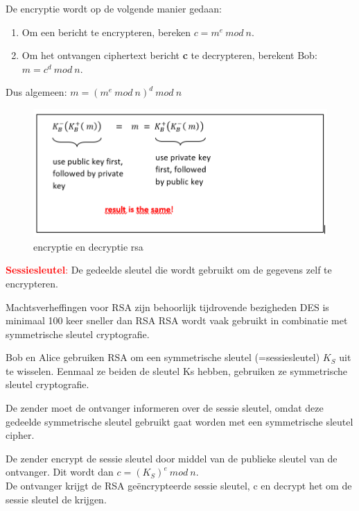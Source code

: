 
De encryptie wordt op de volgende manier gedaan:

\begin{enumerate}
\item Om een bericht te encrypteren, bereken $c = m^e\ mod\ n$.
\item Om het ontvangen ciphertext bericht \textbf{c} te decrypteren, berekent Bob: $m = c^d\ mod\ n$.
\end{enumerate}

\noindent Dus algemeen: $m = (m^e\ mod\ n)^d \ mod\ n$

\begin{figure}[h]
    \centering
    \includegraphics[width=7in]{./img/imghfdst8/diffie.PNG}
    \caption{encryptie en decryptie rsa}      
    \label{fig:encryptie en decryptie rsa }
\end{figure}


\textcolor{red}{\textbf{Sessiesleutel}:} De gedeelde sleutel die wordt gebruikt om de gegevens zelf te encrypteren.

\bi
\itf Machtsverheffingen voor RSA zijn behoorlijk tijdrovende bezigheden
\itf DES is minimaal 100 keer sneller dan RSA
\ei
RSA wordt vaak gebruikt in combinatie met symmetrische sleutel cryptografie.

Bob en Alice gebruiken RSA om een symmetrische sleutel (=sessiesleutel) $K_S$ uit te wisselen. Eenmaal ze beiden de sleutel Ks hebben, gebruiken ze symmetrische sleutel cryptografie.

De zender moet de ontvanger informeren over de sessie sleutel, omdat deze gedeelde symmetrische sleutel gebruikt gaat worden met een symmetrische sleutel cipher.

De zender encrypt de sessie sleutel door middel van de publieke sleutel van de ontvanger. Dit wordt dan $c = (K_S)^e\ mod\ n$.\\ De ontvanger krijgt de RSA geëncrypteerde sessie sleutel, c en decrypt het om de sessie sleutel de krijgen.

